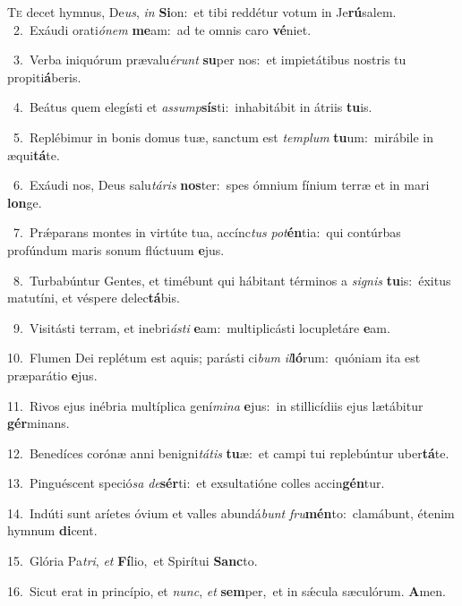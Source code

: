 \lettrine{\initial\textcolor{\initialcolor}{T}}{e} decet hymnus, De\-\textit{us}\-, \textit{in} \textbf{Si}\-on:~\star et tibi reddétur votum in Je\-\textbf{rú}\-salem.\\
{\numbfont\textcolor{\numbcolor}{~2.}}~Exáudi orati\-\textit{ó}\-\textit{nem} \textbf{me}\-am:~\star ad te omnis caro \textbf{vé}\-niet.\par
{\numbfont\textcolor{\numbcolor}{~3.}}~Verba iniquórum prævalu\-\textit{é}\-\textit{runt} \textbf{su}\-per nos:~\star et impietátibus nostris tu propiti\-\textbf{á}\-beris.\par
{\numbfont\textcolor{\numbcolor}{~4.}}~Beátus quem elegísti et \textit{as}\-\textit{sump}\textbf{sís}ti:~\star inhabitábit in átriis \textbf{tu}\-is.\par
{\numbfont\textcolor{\numbcolor}{~5.}}~Replébimur in bonis domus tuæ, sanctum est \textit{tem}\-\textit{plum} \textbf{tu}\-um:~\star mirábile in æqui\-\textbf{tá}\-te.\par
{\numbfont\textcolor{\numbcolor}{~6.}}~Exáudi nos, Deus salu\-\textit{tá}\-\textit{ris} \textbf{nos}\-ter:~\star spes ómnium fínium terræ et in mari \textbf{lon}\-ge.\par
{\numbfont\textcolor{\numbcolor}{~7.}}~Prǽparans montes in virtúte tua, accínc\textit{tus} \textit{pot}\-\textbf{én}tia:~\star qui contúrbas profúndum maris sonum flúctuum \textbf{e}\-jus.\par
{\numbfont\textcolor{\numbcolor}{~8.}}~Turbabúntur Gentes, et timébunt qui hábitant términos a \textit{si}\-\textit{gnis} \textbf{tu}\-is:~\star éxitus matutíni, et véspere delec\-\textbf{tá}\-bis.\par
{\numbfont\textcolor{\numbcolor}{~9.}}~Visitásti terram, et inebri\-\textit{ás}\-\textit{ti} \textbf{e}\-am:~\star multiplicásti locupletáre \textbf{e}\-am.\par
{\numbfont\textcolor{\numbcolor}{10.}}~Flumen Dei replétum est aquis; parásti ci\textit{bum} \textit{il}\-\textbf{ló}rum:~\star quóniam ita est præparátio \textbf{e}\-jus.\par
{\numbfont\textcolor{\numbcolor}{11.}}~Rivos ejus inébria multíplica gení\-\textit{mi}\-\textit{na} \textbf{e}\-jus:~\star in stillicídiis ejus lætábitur \textbf{gér}\-minans.\par
{\numbfont\textcolor{\numbcolor}{12.}}~Benedíces corónæ anni benigni\-\textit{tá}\-\textit{tis} \textbf{tu}\-æ:~\star et campi tui replebúntur uber\-\textbf{tá}\-te.\par
{\numbfont\textcolor{\numbcolor}{13.}}~Pinguéscent speció\textit{sa} \textit{de}\-\textbf{sér}ti:~\star et exsultatióne colles accin\-\textbf{gén}\-tur.\par
{\numbfont\textcolor{\numbcolor}{14.}}~Indúti sunt aríetes óvium et valles abundá\textit{bunt} \textit{fru}\-\textbf{mén}to:~\star clamábunt, étenim hymnum \textbf{di}\-cent.\par
{\numbfont\textcolor{\numbcolor}{15.}}~Glória Pa\-\textit{tri}\-, \textit{et} \textbf{Fí}\-lio,~\star et Spirítui \textbf{Sanc}\-to.\par
{\numbfont\textcolor{\numbcolor}{16.}}~Sicut erat in princípio, et \textit{nunc}\-, \textit{et} \textbf{sem}\-per,~\star et in sǽcula sæculórum. \textbf{A}\-men.\par
